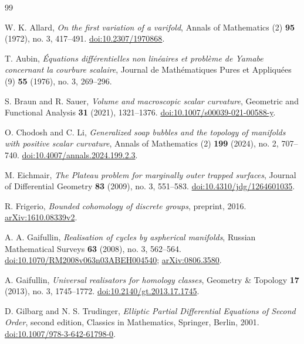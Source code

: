 \begin{thebibliography}{99}

W. K. Allard, \emph{On the first variation of a varifold},
Annals of Mathematics (2) \textbf{95} (1972), no. 3, 417--491.
\href{https://doi.org/10.2307/1970868}{doi:10.2307/1970868}.

T. Aubin, \emph{\'Equations diff\'erentielles non lin\'eaires et
probl\`eme de Yamabe concernant la courbure scalaire},
Journal de Math\'ematiques Pures et Appliqu\'ees (9) \textbf{55}
(1976), no. 3, 269--296.

S. Braun and R. Sauer, \emph{Volume and macroscopic scalar curvature},
Geometric and Functional Analysis \textbf{31} (2021), 1321--1376.
\href{https://doi.org/10.1007/s00039-021-00588-y}
{doi:10.1007/s00039-021-00588-y}.

O. Chodosh and C. Li, \emph{Generalized soap bubbles and the topology
of manifolds with positive scalar curvature},
Annals of Mathematics (2) \textbf{199} (2024), no. 2, 707--740.
\href{https://doi.org/10.4007/annals.2024.199.2.3}
{doi:10.4007/\allowbreak annals.2024.199.2.3}.

M. Eichmair, \emph{The Plateau problem for marginally outer trapped
surfaces}, Journal of Differential Geometry \textbf{83} (2009),
no. 3, 551--583.
\href{https://doi.org/10.4310/jdg/1264601035}
{doi:10.4310/jdg/1264601035}.

R. Frigerio, \emph{Bounded cohomology of discrete groups},
preprint, 2016.
\href{https://arxiv.org/abs/1610.08339v2}{arXiv:1610.08339v2}.

A. A. Gaifullin, \emph{Realisation of cycles by aspherical manifolds},
Russian Mathematical Surveys \textbf{63} (2008), no. 3, 562--564.
\href{https://doi.org/10.1070/RM2008v063n03ABEH004540}
{doi:10.1070/RM2008v063n03ABEH004540};
\href{https://arxiv.org/abs/0806.3580}{arXiv:0806.3580}.

A. Gaifullin, \emph{Universal realisators for homology classes},
Geometry \& Topology \textbf{17} (2013), no. 3, 1745--1772.
\href{https://doi.org/10.2140/gt.2013.17.1745}
{doi:10.2140/gt.2013.17.1745}.

D. Gilbarg and N. S. Trudinger,
\emph{Elliptic Partial Differential Equations of Second Order},
second edition, Classics in Mathematics, Springer, Berlin, 2001.
\href{https://doi.org/10.1007/978-3-642-61798-0}
{doi:10.1007/978-3-642-61798-0}.


\end{thebibliography}
